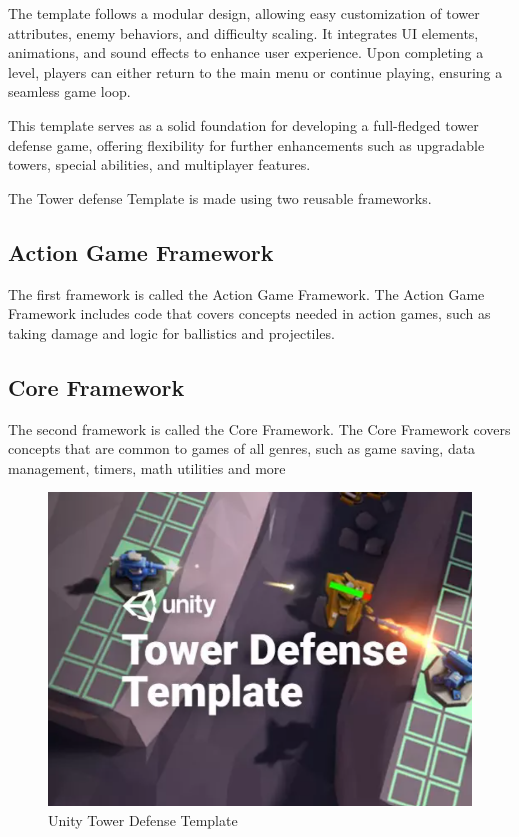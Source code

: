 \documentclass[12pt,a4paper]{report}
\begin{document}
The template follows a modular design, allowing easy customization of tower attributes, enemy behaviors, and difficulty scaling. It integrates UI elements, animations, and sound effects to enhance user experience. Upon completing a level, players can either return to the main menu or continue playing, ensuring a seamless game loop.

This template serves as a solid foundation for developing a full-fledged tower defense game, offering flexibility for further enhancements such as upgradable towers, special abilities, and multiplayer features. 

The Tower defense Template is made using two reusable frameworks.
\subsection{Action Game Framework}
The first framework is called the Action Game Framework. The Action Game Framework
includes code that covers concepts needed in action games, such as taking damage and logic
for ballistics and projectiles.

\subsection{Core Framework}
The second framework is called the Core Framework. The Core Framework covers concepts
that are common to games of all genres, such as game saving, data management, timers, math
utilities and more

\begin{figure}[h!]
	\centering
	\includegraphics[scale=0.5]{images/UnityTDTemplate.png}
	\caption{Unity Tower Defense Template}
	\label{fig:UnityTDTemplate}
\end{figure}
\end{document}
